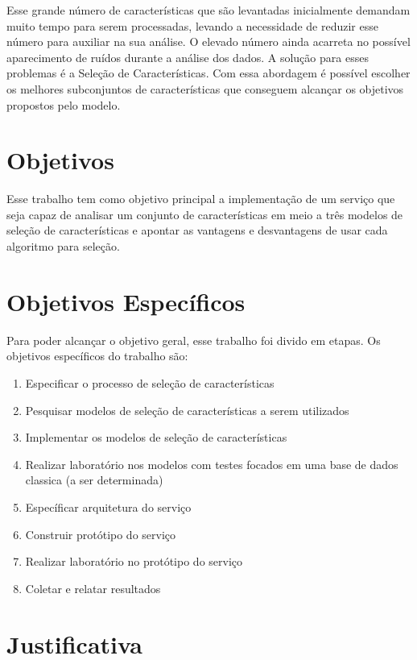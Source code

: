 Esse grande número de características que são levantadas inicialmente demandam muito tempo para serem processadas, levando a necessidade de reduzir esse número para auxiliar na sua análise. O elevado número ainda acarreta no possível aparecimento de ruídos durante a análise dos dados. A solução para esses problemas é a Seleção de Características. Com essa abordagem é possível escolher os melhores subconjuntos de características que conseguem alcançar os objetivos propostos pelo modelo. 


\section{Objetivos}

Esse trabalho tem como objetivo principal a implementação de um serviço que seja capaz de analisar um conjunto de características em meio a três modelos de seleção de características e apontar as vantagens e desvantagens de usar cada algoritmo para seleção.

\section{Objetivos Específicos}

Para poder alcançar o objetivo geral, esse trabalho foi divido em etapas. Os objetivos específicos do trabalho são:

\begin{enumerate}
	\item{Especificar o processo de seleção de características}
	\item{Pesquisar modelos de seleção de características a serem utilizados}
	\item{Implementar os modelos de seleção de características}
	\item{Realizar laboratório nos modelos com testes focados em uma base de dados classica (a ser determinada)}
	\item{Específicar arquitetura do serviço}
	\item{Construir protótipo do serviço}
	\item{Realizar laboratório no protótipo do serviço}
	\item{Coletar e relatar resultados}
\end{enumerate}


\section{Justificativa}

